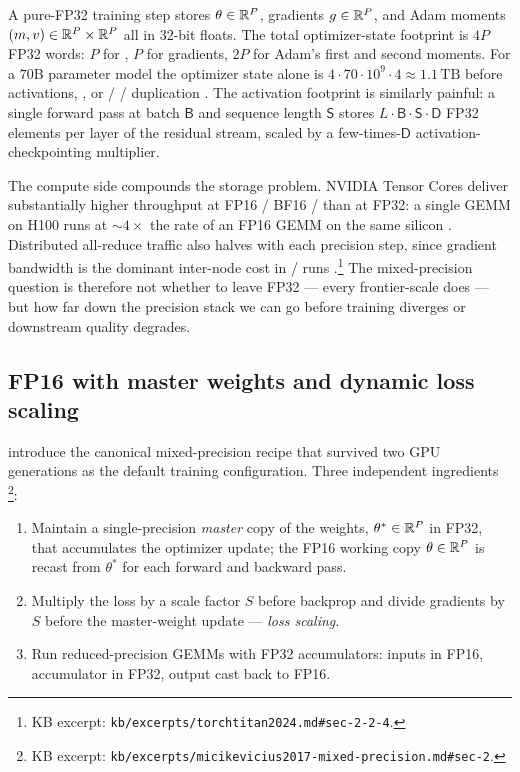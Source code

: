A pure-FP32 training step stores  $\theta \in \mathbb{R}^P$,
gradients $g \in \mathbb{R}^P$, and Adam moments $(m, v) \in \mathbb{R}^P \times \mathbb{R}^P$
all in 32-bit floats. The total optimizer-state footprint is $4P$ FP32
words: $P$ for , $P$ for gradients, $2P$ for Adam's first and
second moments. For a $70$B parameter model the optimizer state alone is
$4 \cdot 70 \cdot 10^{9} \cdot 4 \approx 1.1\,\text{TB}$ before
activations, , or  /  /  duplication
\citep[\S 2]{kalamkar2019-bfloat16}. The activation footprint is
similarly painful: a single forward pass at batch $\mathsf{B}$ and
sequence length $\mathsf{S}$ stores $L \cdot \mathsf{B} \cdot
\mathsf{S} \cdot \mathsf{D}$ FP32 elements per layer of the residual
stream, scaled by a few-times-$\mathsf{D}$ activation-checkpointing
multiplier.

The compute side compounds the storage problem. NVIDIA Tensor Cores
deliver substantially higher throughput at FP16 / BF16 /  than at
FP32: a single  GEMM on H100 runs at $\sim 4\times$ the rate of an
FP16 GEMM on the same silicon \citep[\S 3.3]{deepseek-v3}. Distributed
all-reduce traffic also halves with each precision step, since
gradient bandwidth is the dominant inter-node cost in  /  runs
\citep[\S 2.2.4]{torchtitan2024}.\footnote{KB excerpt:
\texttt{kb/excerpts/torchtitan2024.md\#sec-2-2-4}.} The mixed-precision
question is therefore not whether to leave FP32 — every frontier-scale
 does — but how far down the precision stack we can go before
training diverges or downstream quality degrades.

\subsection{FP16 with master weights and dynamic loss scaling}
\label{sec:mp-fp16}

\citet{micikevicius2017-mixed-precision} introduce the canonical
mixed-precision recipe that survived two GPU generations as the default
training configuration. Three independent ingredients
\citep[\S 2--4]{micikevicius2017-mixed-precision}\footnote{KB excerpt:
\texttt{kb/excerpts/micikevicius2017-mixed-precision.md\#sec-2}.}:

\begin{enumerate}
\item Maintain a single-precision \emph{master} copy of the weights,
$\theta^* \in \mathbb{R}^P$ in FP32, that accumulates the optimizer update;
the FP16 working copy $\theta \in \mathbb{R}^P$ is recast from $\theta^*$ for
each forward and backward pass.
\item Multiply the loss by a scale factor $S$ before backprop and
divide gradients by $S$ before the master-weight update — \emph{loss
scaling}.
\item Run reduced-precision GEMMs with FP32 accumulators: inputs in
FP16, accumulator in FP32, output cast back to FP16.
\end{enumerate}

